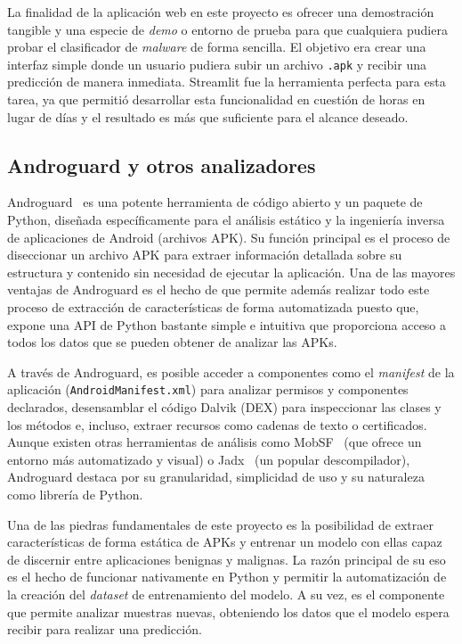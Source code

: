 La finalidad de la aplicación web en este proyecto es ofrecer una demostración tangible y una especie de \textit{demo} o entorno de prueba para que cualquiera pudiera probar el clasificador de \textit{malware} de forma sencilla. El objetivo era crear una interfaz simple donde un usuario pudiera subir un archivo \texttt{.apk} y recibir una predicción de manera inmediata. Streamlit fue la herramienta perfecta para esta tarea, ya que permitió desarrollar esta funcionalidad en cuestión de horas en lugar de días y el resultado es más que suficiente para el alcance deseado.

\subsection{Androguard y otros analizadores}


Androguard~\cite{githubAndroguard} es una potente herramienta de código abierto y un paquete de Python, diseñada específicamente para el análisis estático y la ingeniería inversa de aplicaciones de Android (archivos APK). Su función principal es el proceso de diseccionar un archivo APK para extraer información detallada sobre su estructura y contenido sin necesidad de ejecutar la aplicación. Una de las mayores ventajas de Androguard es el hecho de que permite además realizar todo este proceso de extracción de características de forma automatizada puesto que, expone una API de Python bastante simple e intuitiva que proporciona acceso a todos los datos que se pueden obtener de analizar las APKs.

A través de Androguard, es posible acceder a componentes como el \textit{manifest} de la aplicación (\texttt{AndroidManifest.xml}) para analizar permisos y componentes declarados, desensamblar el código Dalvik (DEX) para inspeccionar las clases y los métodos e, incluso, extraer recursos como cadenas de texto o certificados. Aunque existen otras herramientas de análisis como MobSF~\cite{githubMobSF} (que ofrece un entorno más automatizado y visual) o Jadx~\cite{githubSkylotjadx} (un popular descompilador), Androguard destaca por su granularidad, simplicidad de uso y su naturaleza como librería de Python.

Una de las piedras fundamentales de este proyecto es la posibilidad de extraer características de forma estática de APKs y entrenar un modelo con ellas capaz de discernir entre aplicaciones benignas y malignas. La razón principal de su eso es el hecho de funcionar nativamente en Python y permitir la automatización de la creación del \textit{dataset} de entrenamiento del modelo. A su vez, es el componente que permite analizar muestras nuevas, obteniendo los datos que el modelo espera recibir para realizar una predicción.

